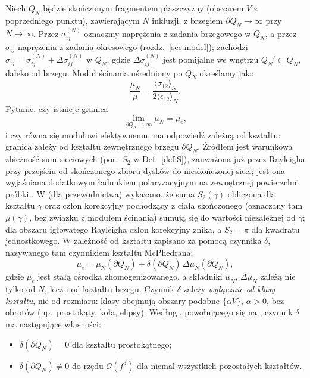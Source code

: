 \documentclass[12pt,a4paper,twoside,openright]{report}
\theoremstyle{definition}
\theoremstyle{remark}
\begin{document}
Niech $Q_N$ będzie skończonym fragmentem płaszczyzny (obszarem $V$ z poprzedniego punktu), zawierającym $N$ inkluzji, z brzegiem $\partial Q_N\to\infty$ przy $N\to\infty$. Przez $\sigma^{(N)}_{ij}$ oznaczmy naprężenia z zadania brzegowego w $Q_N$, a przez $\sigma_{ij}$ naprężenia z zadania okresowego (rozdz.~\ref{sec:model}); zachodzi $\sigma_{ij}=\sigma^{(N)}_{ij}+\Delta\sigma^{(N)}_{ij}$ w $Q_N$, gdzie $\Delta\sigma^{(N)}_{ij}$ jest pomijalne we wnętrzu $Q_N'\subset Q_N$, daleko od brzegu. Moduł ścinania uśredniony po $Q_N$ określamy jako
\begin{equation}\label{eq:muN}
\frac{\mu_N}{\mu}=\frac{\langle\sigma_{12}\rangle_N}{2\langle\epsilon_{12}\rangle_N}.
\end{equation}
Pytanie, czy istnieje granica
\begin{equation}\label{eq:limit}
\lim_{\partial Q_N\to\infty}\mu_N=\mu_e,
\end{equation}
i czy równa się modułowi efektywnemu, ma odpowiedź zależną od kształtu: granica zależy od kształtu zewnętrznego brzegu $\partial Q_N$. Źródłem jest warunkowa zbieżność sum sieciowych (por.~$S_2$ w Def.~\ref{def:S}), zauważona już przez Rayleigha \cite{rayleigh1892lvi} przy przejściu od skończonego zbioru dysków do nieskończonej sieci; jest ona wyjaśniana dodatkowym ładunkiem polaryzacyjnym na zewnętrznej powierzchni próbki \cite{mcphedran1978conductivity,mckenzie1978conductivity,mityushev1997transport}. W \cite{mityushev1997transport} (dla przewodnictwa) wykazano, że suma $S_2(\gamma)$ obliczona dla kształtu $\gamma$ oraz człon korekcyjny pochodzący z ciała skończonego (oznaczany tam $\mu(\gamma)$, bez związku z modułem ścinania) sumują się do wartości niezależnej od $\gamma$; dla obszaru igłowatego Rayleigha człon korekcyjny znika, a $S_2=\pi$ dla kwadratu jednostkowego. W \cite{czapla2025computational} zależność od kształtu zapisano za pomocą czynnika $\delta$, nazywanego tam czynnikiem kształtu McPhedrana:
\begin{equation}\label{eq:shape5}
\mu_e=\mu_N(\partial Q_N)+\delta(\partial Q_N)\,\Delta\mu_N(\partial Q_N),
\end{equation}
gdzie $\mu_e$ jest stałą ośrodka zhomogenizowanego, a składniki $\mu_N$, $\Delta\mu_N$ zależą nie tylko od $N$, lecz i od kształtu brzegu. Czynnik $\delta$ zależy \emph{wyłącznie od klasy kształtu}, nie od rozmiaru: klasy obejmują obszary podobne $\{\alpha V\}$, $\alpha>0$, bez obrotów (np.\ prostokąty, koła, elipsy). Według \cite{czapla2025computational}, powołującego się na \cite{rayleigh1892lvi,mcphedran1978conductivity,mckenzie1978conductivity}, czynnik $\delta$ ma następujące własności:
\begin{itemize}[nosep]
\item $\delta(\partial Q_N)=0$ dla kształtu prostokątnego;
\item $\delta(\partial Q_N)\neq0$ do rzędu $\mathcal O(f^3)$ dla niemal wszystkich pozostałych kształtów.
\end{itemize}
\end{document}
